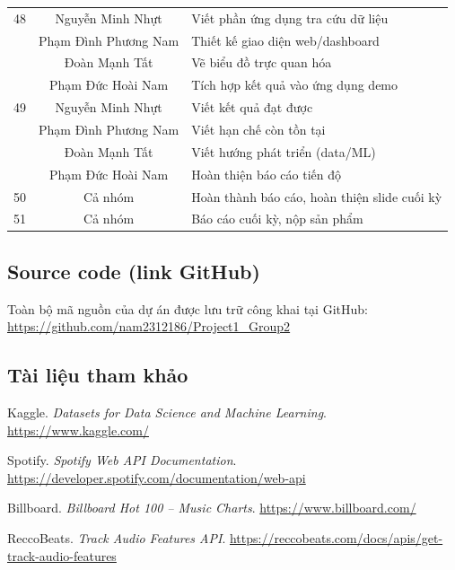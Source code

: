 \documentclass{../hcmut-report}
\begin{document}
\begin{center}
\begin{longtable}{|c|c|p{10cm}|}
\hline
48 & Nguyễn Minh Nhựt & Viết phần ứng dụng tra cứu dữ liệu \\
   & Phạm Đình Phương Nam & Thiết kế giao diện web/dashboard \\
   & Đoàn Mạnh Tất & Vẽ biểu đồ trực quan hóa \\
   & Phạm Đức Hoài Nam & Tích hợp kết quả vào ứng dụng demo \\
\hline
49 & Nguyễn Minh Nhựt & Viết kết quả đạt được \\
   & Phạm Đình Phương Nam & Viết hạn chế còn tồn tại \\
   & Đoàn Mạnh Tất & Viết hướng phát triển (data/ML) \\
   & Phạm Đức Hoài Nam & Hoàn thiện báo cáo tiến độ \\
\hline
50 & Cả nhóm & Hoàn thành báo cáo, hoàn thiện slide cuối kỳ \\
\hline
51 & Cả nhóm &   Báo cáo cuối kỳ, nộp sản phẩm \\
\hline
\end{longtable}
\end{center}

\subsection{Source code (link GitHub)}

Toàn bộ mã nguồn của dự án được lưu trữ công khai tại GitHub: 
\url{https://github.com/nam2312186/Project1_Group2}



\subsection{Tài liệu tham khảo}

\begin{thebibliography}{9}

Kaggle. \textit{Datasets for Data Science and Machine Learning}.  
\url{https://www.kaggle.com/}

Spotify. \textit{Spotify Web API Documentation}.  
\url{https://developer.spotify.com/documentation/web-api}

Billboard. \textit{Billboard Hot 100 – Music Charts}.  
\url{https://www.billboard.com/}

ReccoBeats. \textit{Track Audio Features API}.  
\url{https://reccobeats.com/docs/apis/get-track-audio-features}

\end{thebibliography}
\end{document}
